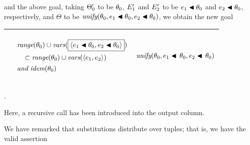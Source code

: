 \documentclass[runningheads]{llncs}
\DeclareMathOperator{\uand}{\emph{and}\,}
\DeclareMathOperator{\unify}{\emph{unify}}
\DeclareMathOperator{\idem}{\emph{idem}}
\begin{document}
and the above goal, taking $\Theta_{0}'$ to be $\theta_{0}$, $E_{1}'$ and $E_{2}'$ to be $ e_{1}\blacktriangleleft\theta_{0} $ and $ e_{2}\blacktriangleleft\theta_{0}$, respectively, and $\Theta$ to be $\unify(\thet{0}, \e{1}\apply\thet{0}, \e{2}\apply\thet{0})$, we obtain the new goal 
\begin{center}
\begin{tabular}{|m{}|m{}||m{}|}
 \hline 
  & 
 \begin{center}
{$\begin{aligned}
 &\begin{aligned}
  &\,\range(\thet{0}) \cup \vars(
  \boxed{\langle \e{1}\apply\thet{0}, \e{2}\apply\thet{0}\rangle} 
  ) \\ 
  &\quad  \subset \range(\thet{0}) \cup \vars( \langle \e{1}, \e{2}\rangle ) 
\end{aligned}  \\
& \uand \idem(\thet{0}) 
 \end{aligned} $}
\end{center}
& 
\begin{center}$\unify(\thet{0}, \e{1}\apply\,\thet{0}, \e{2}\apply\,\thet{0})$ \end{center}\\
\hline
\end{tabular}.
\end{center}
Here, a recursive call has been introduced into the output column.

We have remarked that substitutions distribute over tuples; that is, we have the valid assertion
\end{document}
